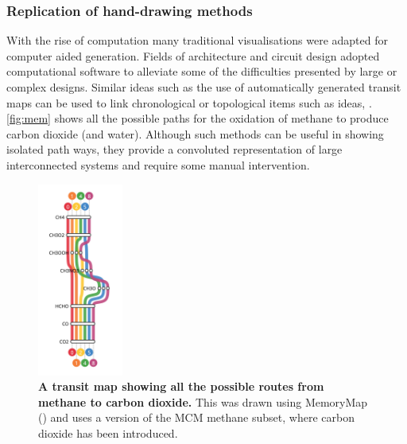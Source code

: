 \subsubsection{Replication of hand-drawing methods}
With the rise of computation many traditional visualisations were adapted for computer aided generation. Fields of architecture and circuit design adopted computational software to alleviate some of the difficulties presented by large or complex designs. Similar ideas such as the use of automatically generated transit maps  can be used to link chronological or topological items such as ideas, \cite{memory}. \autoref{fig:mem} shows all the possible paths for the oxidation of methane to produce carbon dioxide (and water). Although such methods can be useful in showing isolated path ways, they provide a convoluted representation of large interconnected systems and require some manual intervention. 



\begin{figure}[H]
     \centering
     \includegraphics[width=0.25\textwidth]{figures_c1/layout/memory.png}
         \caption{\textbf{A transit map showing all the possible routes from methane to carbon dioxide.} This was drawn using MemoryMap (\cite{memory}) and uses a version of the MCM methane subset, where carbon dioxide has been introduced. }
        \label{fig:mem}
\end{figure}





